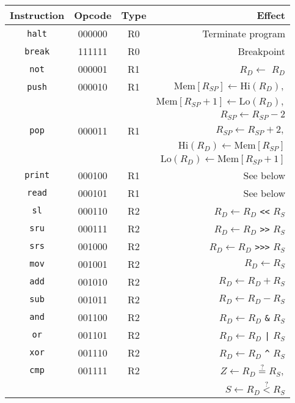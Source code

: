 \documentclass[12pt]{scrartcl}
\newcommand{\textapprox}{\raisebox{0.5ex}{\texttildelow}}
\begin{document}
\begin{center}
  \begin{longtable}{c c c r}
    \textbf{Instruction} & \textbf{Opcode} & \textbf{Type} & \textbf{Effect} \\
    \hline \hline
    \texttt{halt} & 000000 & R0 & Terminate program \\
    \texttt{break}& 111111 & R0 & Breakpoint \\
    \texttt{not}  & 000001 & R1 & $R_D \gets$ \texttt{\textapprox} $R_D$ \\
    \texttt{push} & 000010 & R1 & $\mathrm{Mem}[R_{SP}] \gets \mathrm{Hi}(R_D),$ \\
    & & &                         $\mathrm{Mem}[R_{SP}+1] \gets \mathrm{Lo}(R_D),$ \\
    & & &                         $R_{SP} \gets R_{SP} - 2$ \\
    \texttt{pop}  & 000011 & R1 & $R_{SP} \gets R_{SP} + 2,$ \\
    & & &                         $\mathrm{Hi}(R_D) \gets \mathrm{Mem}[R_{SP}]$ \\
    & & &                         $\mathrm{Lo}(R_D) \gets \mathrm{Mem}[R_{SP}+1]$ \\
    \texttt{print}& 000100 & R1 & See below \\
    \texttt{read} & 000101 & R1 & See below \\
    \texttt{sl}   & 000110 & R2 & $R_D \gets R_D$ \texttt{<<} $R_S$ \\
    \texttt{sru}  & 000111 & R2 & $R_D \gets R_D$ \texttt{>>} $R_S$ \\
    \texttt{srs}  & 001000 & R2 & $R_D \gets R_D$ \texttt{>>>} $R_S$ \\
    \texttt{mov}  & 001001 & R2 & $R_D \gets R_S$ \\
    \texttt{add}  & 001010 & R2 & $R_D \gets R_D + R_S$ \\
    \texttt{sub}  & 001011 & R2 & $R_D \gets R_D - R_S$ \\
    \texttt{and}  & 001100 & R2 & $R_D \gets R_D$ \texttt{\&} $R_S$ \\
    \texttt{or}   & 001101 & R2 & $R_D \gets R_D$ \texttt{|} $R_S$ \\
    \texttt{xor}  & 001110 & R2 & $R_D \gets R_D$ \texttt{\^{}} $R_S$ \\
    \texttt{cmp}  & 001111 & R2 & $Z \gets R_D \stackrel{?}{=} R_S,$ \\
    & & &                         $S \gets R_D \stackrel{?}{<} R_S$ \\

\end{longtable}
\end{center}
\end{document}
